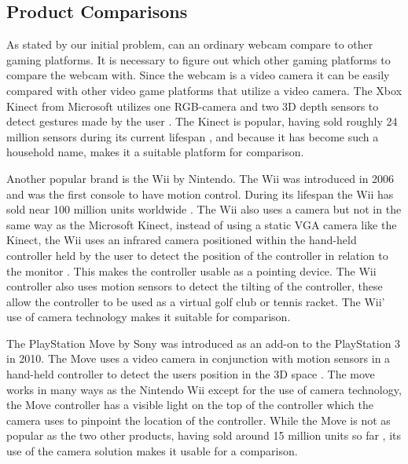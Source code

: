 \subsection{Product Comparisons}
As stated by our initial problem, can an ordinary webcam compare to other gaming platforms. It is necessary to figure out which other gaming platforms to compare the webcam with. Since the webcam is a video camera it can be easily compared with other video game platforms that utilize a video camera. The Xbox Kinect from Microsoft utilizes one RGB-camera and two 3D depth sensors to detect gestures made by the user \parencite{Cong}. The Kinect is popular, having sold roughly 24 million sensors during its current lifespan \parencite{MSByNumbers}, and because it has become such a household name, makes it a suitable platform for comparison.
\bigskip

Another popular brand is the Wii by Nintendo. The Wii was introduced in 2006 and was the first console to have motion control. During its lifespan the Wii has sold near 100 million units worldwide \parencite{NintendoSales}. The Wii also uses a camera but not in the same way as the Microsoft Kinect, instead of using a static VGA camera like the Kinect, the Wii uses an infrared camera positioned within the hand-held controller held by the user to detect the position of the controller in relation to the monitor \parencite{Castaneda2006}. This makes the controller usable as a pointing device. The Wii controller also uses motion sensors to detect the tilting of the controller, these allow the controller to be used as a virtual golf club or tennis racket. The Wii’ use of camera technology makes it suitable for comparison.
\bigskip

The PlayStation Move by Sony was introduced as an add-on to the PlayStation 3 in 2010. The Move uses a video camera in conjunction with motion sensors in a hand-held controller to detect the users position in the 3D space \parencite{Kumar2009}. The move works in many ways as the Nintendo Wii except for the use of camera technology, the Move controller has a visible light on the top of the controller which the camera uses to pinpoint the location of the controller. While the Move is not as popular as the two other products, having sold around 15 million units so far \parencite{Yin-Poole2012}, its use of the camera solution makes it usable for a comparison.
